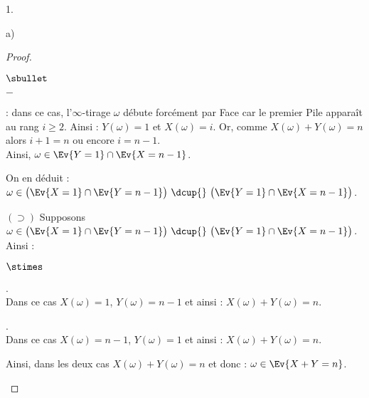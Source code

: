 \documentclass[11pt]{article}%
\begin{document}
\begin{noliste}{1.}
\begin{noliste}{a)}
\begin{proof}
\begin{liste}{$\sbullet$}
\begin{noliste}{$-$}
        \item {} : dans ce
          cas, l'$\infty$-tirage $\omega$ débute forcément par Face
          car le premier Pile apparaît au rang $ i\geq 2$. Ainsi :
          $Y(\omega) = 1$ et $X(\omega) = i$. Or, comme $X(\omega) +
          Y(\omega) = n$ alors  $i+1 = n$ ou encore $i = n-1$.\\[.2cm]
          Ainsi, $\omega \in \Ev{Y = 1} \cap \Ev{X = n-1}$.
        \end{noliste}
        On en déduit : $\omega \in \big( \Ev{X = 1} \cap \Ev{Y = n-1}
        \big) \ \dcup{} \ \big( \Ev{Y = 1} \cap \Ev{X = n-1} \big)$.

      \item[$(\supset)$] Supposons $\omega \in \big( \Ev{X = 1} \cap
        \Ev{Y = n-1} \big) \ \dcup{} \ \big( \Ev{Y = 1} \cap \Ev{X =
          n-1} \big)$. Ainsi :
        \begin{noliste}{$\stimes$}
        \item {}.\\[.1cm]
          Dans ce cas $X(\omega) = 1$, $Y(\omega) = n-1$ et ainsi :
          $X(\omega) + Y(\omega) = n$.

        \item {}.\\[.1cm]
          Dans ce cas $X(\omega) = n-1$, $Y(\omega) = 1$ et ainsi :
          $X(\omega) + Y(\omega) = n$.
        \end{noliste}
        Ainsi, dans les deux cas $X(\omega) + Y(\omega) = n$ et donc :
        $\omega \in \Ev{X + Y = n}$.
      \end{liste}



\end{proof}
\end{noliste}
\end{noliste}
\end{document}
